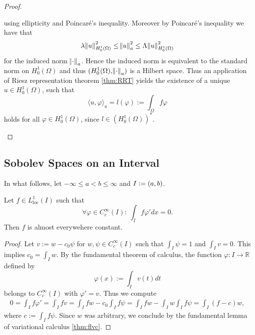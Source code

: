 \begin{proof}
\begin{enumerate}[label = \textit{Step \arabic*:},wide=0pt]
\begin{equation*}
			\end{equation*}
			\noindent using ellipticity and Poincar\'e's inequality. Moreover by Poincar\'e's inequality we have that
			\begin{equation*}
				\lambda \norm{u}^2_{H^1_0(\Omega)} \leq \norm{u}_a^2 \leq \Lambda \norm{u}_{H^1_0(\Omega)}^2
			\end{equation*}
			\noindent for the induced norm $\norm{\cdot}_a$. Hence the induced norm is equivalent to the standard norm on $H^1_0(\Omega)$ and thus $(H^1_0(\Omega),\norm{\cdot}_a)$ is a Hilbert space. Thus an application of Riesz representation theorem \ref{thm:RRT} yields the existence of a unique $u \in H^1_0(\Omega)$, such that
			\begin{equation*}
				\langle u,\varphi \rangle_a = l(\varphi) := \int_\Omega f \varphi
			\end{equation*}
			\noindent holds for all $\varphi \in H^1_0(\Omega)$, since $l \in (H^1_0(\Omega))^*$.
	\end{enumerate}
\end{proof}

\subsection*{Sobolev Spaces on an Interval}
In what follows, let $-\infty \leq a < b \leq \infty$ and $I := \intoo{a,b}$.

\begin{lemma}
	\label{lem:BoisReymond}
	Let $f \in L^1_{\mathrm{loc}}(I)$ such that
	\begin{equation*}
		\forall \varphi \in C^\infty_c(I): \> \int_I f\varphi' dx = 0.
	\end{equation*}
	Then $f$ is almost everywehere constant.
\end{lemma}

\begin{proof}
	Let $v := w - c_0 \psi$ for $w,\psi \in C^\infty_c(I)$ such that $\int_I \psi = 1$ and $\int_I v = 0$. This implies $c_0 = \int_I w$. By the fundamental theorem of calculus, the function $\varphi : I \to \mathbb{R}$ defined by
	\begin{equation*}
		\varphi(x) := \int_I v(t) dt
	\end{equation*}
	\noindent belongs to $C^\infty_c(I)$ with $\varphi' = v$. Thus we compute
	\begin{align*}
		0 = \int_I f \varphi' = \int_I f v = \int_I fw - c_0 \int_I f \psi = \int_I fw - \int_I w \int_I f \psi = \int_I (f - c)w,
	\end{align*}
	\noindent where $c := \int_I f \psi$. Since $w$ was arbitrary, we conclude by the fundamental lemma of variational calculus \ref{thm:flvc}.
\end{proof}

